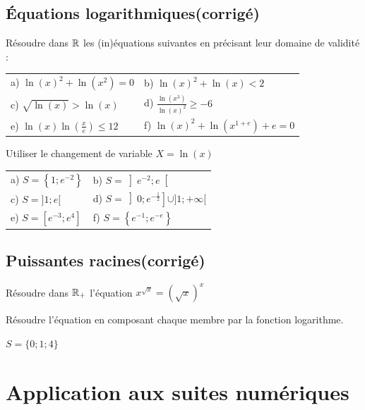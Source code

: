 \documentclass[oneside,12pt]{book}          %
\begin{document}
\subsection{Équations logarithmiques\quad\small{(corrigé)}}
Résoudre dans ${\mathbb R}$ les (in)équations suivantes en précisant leur domaine de validité :

\renewcommand{\arraystretch}{1.6}
\begin{tabular}{p{} p{}}
    a) $\ln(x)^2+\ln(x^2)=0$ & b) $\ln(x)^2+\ln(x)<2$ \\
    c) $\sqrt{\ln(x)}>\ln(x)$ & d) $\frac{\ln(x^3)}{\ln(x)^2}\geq-6$ \\
    e) $\ln(x)\ln(\frac{x}{e})\leq12$ & f) $\ln(x)^2+\ln(x^{1+e})+e=0$
\end{tabular}

\begin{hint}
	Utiliser le changement de variable $X=\ln(x)$
\end{hint}
\begin{sol}
	\begin{tabular}{p{} p{}}
		a) $S=\left\{1;e^{-2}\right\}$ & b) $S=\left]e^{-2};e\right[$ \\
		c) $S=]1;e[$ & d) $S=\left]0;e^{-\frac{1}{2}}\right]\cup]1;+\infty[$\\
		e) $S=\left[e^{-3};e^4\right]$ & f) $S=\left\{e^{-1};e^{-e}\right\}$
    \end{tabular}
\end{sol}



\subsection{Puissantes racines\quad\small{(corrigé)}}
Résoudre dans ${\mathbb R}_+$ l'équation $x^{\sqrt{x}}=(\sqrt{x})^x$

\begin{hint}
	Résoudre l'équation en composant chaque membre par la fonction logarithme.
\end{hint}
\begin{sol}
	$S=\{0;1;4\}$
\end{sol}



\section{Application aux suites numériques}
\end{document}
